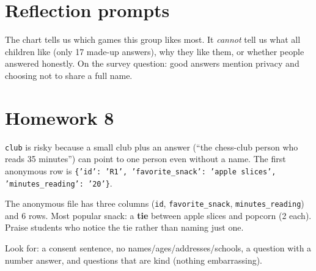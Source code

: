 \section{Reflection prompts}
\begin{answer}
The chart tells us which games this group likes most. It \emph{cannot} tell us what all children like (only 17 made-up answers), why they like them, or whether people answered honestly. On the survey question: good answers mention privacy and choosing not to share a full name.
\end{answer}

\section{Homework 8}
\begin{answer}[Core]
\texttt{club} is risky because a small club plus an answer (\enquote{the chess-club person who reads 35 minutes}) can point to one person even without a name. The first anonymous row is \texttt{\{'id': 'R1', 'favorite\_snack': 'apple slices', 'minutes\_reading': '20'\}}.
\end{answer}
\begin{answer}[Challenge]
The anonymous file has three columns (\texttt{id}, \texttt{favorite\_snack}, \texttt{minutes\_reading}) and 6 rows. Most popular snack: a \textbf{tie} between apple slices and popcorn (2 each). Praise students who notice the tie rather than naming just one.
\end{answer}
\begin{answer}[Creative]
Look for: a consent sentence, no names/ages/addresses/schools, a question with a number answer, and questions that are kind (nothing embarrassing).
\end{answer}
